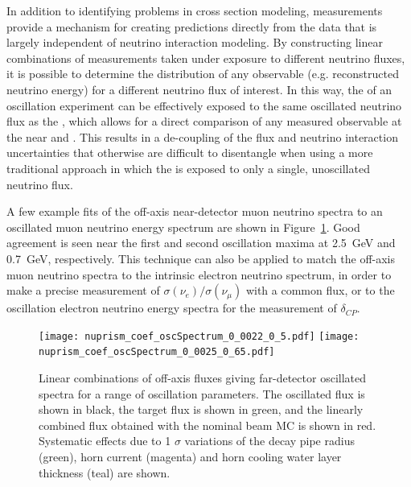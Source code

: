 In addition to identifying problems in cross section modeling,  measurements provide a mechanism for creating   predictions directly from the   data that is largely independent of neutrino interaction modeling. By constructing linear combinations of measurements taken under exposure to different neutrino fluxes, it is possible to determine the distribution of any observable (e.g. reconstructed neutrino energy) for a different neutrino flux of interest. In this way, the   of an oscillation experiment can be effectively exposed to the same oscillated neutrino flux as the  , which allows for a direct comparison of any measured observable at the near and  . This results in a de-coupling of the flux and neutrino interaction uncertainties that otherwise are difficult to disentangle when using a more traditional approach in which the   is exposed to only a single, unoscillated neutrino flux.



A few example fits of the off-axis near-detector muon neutrino spectra to an oscillated   muon neutrino energy spectrum are shown in Figure~\ref{fig:duneprismfluxfits}. Good agreement is seen near the first and second oscillation maxima at 2.5~GeV and 0.7~GeV, respectively. This technique can also be applied to match the off-axis muon neutrino spectra to the   intrinsic electron neutrino spectrum, in order to make a precise measurement of $\sigma(\nu_e)/\sigma(\nu_\mu)$ with a common flux, or to the   oscillation electron neutrino energy spectra for the measurement of $\delta_{CP}$.

\begin{figure}
	\centering
	\texttt{[image: nuprism\_coef\_oscSpectrum\_0\_0022\_0\_5.pdf]}
	\texttt{[image: nuprism\_coef\_oscSpectrum\_0\_0025\_0\_65.pdf]}
\caption{Linear combinations of off-axis fluxes giving far-detector oscillated spectra for a range of oscillation parameters. The   oscillated flux is shown in black, the target flux is shown in green, and the linearly combined flux obtained with the nominal beam MC is shown in red. Systematic effects due to 1 $\sigma$ variations of the decay pipe radius (green), horn current (magenta) and horn cooling water layer thickness (teal) are shown.}
	\label{fig:duneprismfluxfits}
\end{figure}




